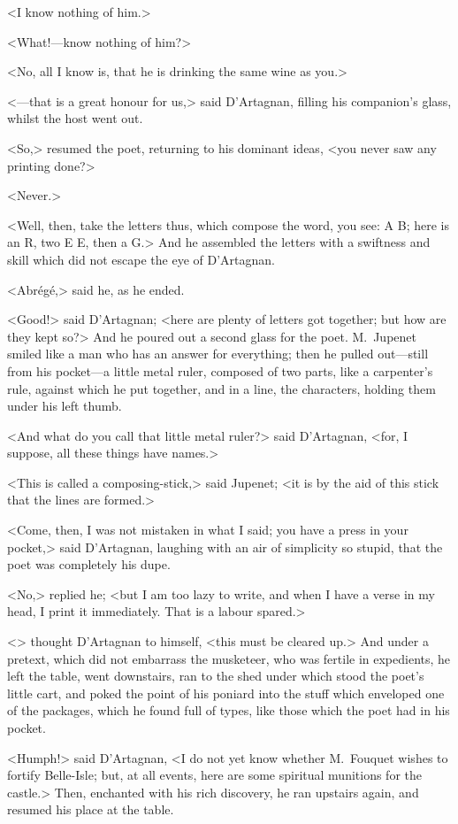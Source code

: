<I know nothing of him.>

<What!—know nothing of him?>

<No, all I know is, that he is drinking the same wine as you.>

<—that is a great honour for us,> said D'Artagnan, filling his companion's glass, whilst the host went out.

<So,> resumed the poet, returning to his dominant ideas, <you never saw any printing done?>

<Never.>

<Well, then, take the letters thus, which compose the word, you see: A B;  here is an R, two E E, then a G.> And he assembled the letters with a swiftness and skill which did not escape the eye of D'Artagnan.

<Abrégé,> said he, as he ended.

<Good!> said D'Artagnan; <here are plenty of letters got together; but how are they kept so?> And he poured out a second glass for the poet. M.~Jupenet smiled like a man who has an answer for everything; then he pulled out—still from his pocket—a little metal ruler, composed of two parts, like a carpenter's rule, against which he put together, and in a line, the characters, holding them under his left thumb.

<And what do you call that little metal ruler?> said D'Artagnan, <for, I suppose, all these things have names.>

<This is called a composing-stick,> said Jupenet; <it is by the aid of this stick that the lines are formed.>

<Come, then, I was not mistaken in what I said; you have a press in your pocket,> said D'Artagnan, laughing with an air of simplicity so stupid, that the poet was completely his dupe.

<No,> replied he; <but I am too lazy to write, and when I have a verse in my head, I print it immediately. That is a labour spared.>

<> thought D'Artagnan to himself, <this must be cleared up.> And under a pretext, which did not embarrass the musketeer, who was fertile in expedients, he left the table, went downstairs, ran to the shed under which stood the poet's little cart, and poked the point of his poniard into the stuff which enveloped one of the packages, which he found full of types, like those which the poet had in his pocket.

<Humph!> said D'Artagnan, <I do not yet know whether M.~Fouquet wishes to fortify Belle-Isle; but, at all events, here are some spiritual munitions for the castle.> Then, enchanted with his rich discovery, he ran upstairs again, and resumed his place at the table.


